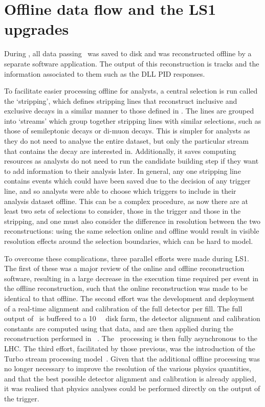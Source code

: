 \section{Offline data flow and the \ac{LS1} upgrades}
\label{chap:intro:lhcb:offline}

During \runone, all data passing \hlttwo\ was saved to disk and was 
reconstructed offline by a separate software application.
The output of this reconstruction is tracks and the information associated to 
them such as the \ac{DLL} \ac{PID} responses.

To facilitate easier processing offline for analysts, a central selection is 
run called the `stripping', which defines stripping lines that reconstruct 
inclusive and exclusive decays in a similar manner to those defined in \hlttwo.
The lines are grouped into `streams' which group together stripping lines with 
similar selections, such as those of semileptonic \PB decays or di-muon decays.
This is simpler for analysts as they do not need to analyse the entire dataset, 
but only the particular stream that contains the decay are interested in.
Additionally, it saves computing resources as analysts do not need to run the 
candidate building step if they want to add information to their analysis 
later.
In general, any one stripping line contains events which could have been saved 
due to the decision of any trigger line, and so analysts were able to choose 
which triggers to include in their analysis dataset offline.
This can be a complex procedure, as now there are at least two sets of 
selections to consider, those in the trigger and those in the stripping, and 
one must also consider the difference in resolution between the two 
reconstructions: using the same selection online and offline would result in 
visible resolution effects around the selection boundaries, which can be hard 
to model.

To overcome these complications, three parallel efforts were made during 
\ac{LS1}.
The first of these was a major review of the online and offline reconstruction 
software, resulting in a large decrease in the execution time required per 
event in the offline reconstruction, such that the online reconstruction was 
made to be identical to that offline.
The second effort was the development and deployment of a real-time alignment 
and calibration of the full detector per fill.
The full output of \hltone\ is buffered to a \SI{10}{\peta\byte} disk farm, the 
detector alignment and calibration constants are computed using that data, and 
are then applied during the reconstruction performed in 
\hlttwo~\cite{Dujany:082010}.
The \hlttwo\ processing is then fully asynchronous to the \ac{LHC}.
The third effort, facilitated by those previous, was the introduction of the 
Turbo stream processing model~\cite{Benson:2019752}.
Given that the additional offline processing was no longer necessary to improve 
the resolution of the various physics quantities, and that the best possible 
detector alignment and calibration is already applied, it was realised that 
physics analyses could be performed directly on the output of the trigger.

